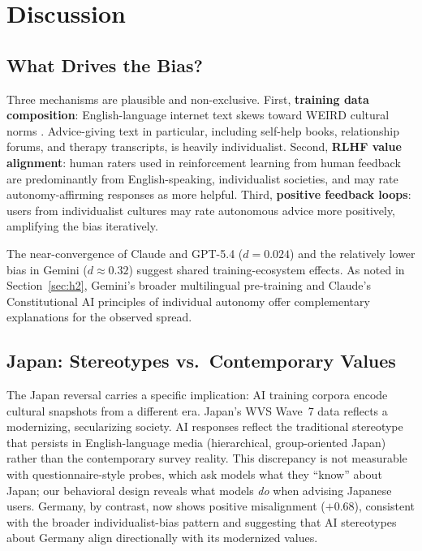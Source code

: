 \documentclass[11pt]{article}
\begin{document}
\section{Discussion}

\subsection{What Drives the Bias?}

Three mechanisms are plausible and non-exclusive. First,
\textbf{training data composition}: English-language internet text skews
toward WEIRD cultural norms \citep{henrich-2010}. Advice-giving text in
particular, including self-help books, relationship forums, and therapy
transcripts, is heavily individualist. Second, \textbf{RLHF value alignment}:
human raters used in reinforcement learning from human feedback are
predominantly from English-speaking, individualist societies, and may rate
autonomy-affirming responses as more helpful. Third, \textbf{positive
feedback loops}: users from individualist cultures may rate autonomous advice
more positively, amplifying the bias iteratively.

The near-convergence of Claude and GPT-5.4 ($d=0.024$) and the
relatively lower bias in Gemini ($d \approx 0.32$) suggest shared
training-ecosystem effects. As noted in Section~\ref{sec:h2}, Gemini's
broader multilingual pre-training and Claude's Constitutional AI principles
of individual autonomy \citep{bai-2022} offer complementary explanations
for the observed spread.

\subsection{Japan: Stereotypes vs.\ Contemporary Values}

The Japan reversal carries a specific implication: AI training corpora encode
cultural snapshots from a different era. Japan's WVS Wave~7 data reflects a
modernizing, secularizing society. AI responses reflect the traditional
stereotype that persists in English-language media (hierarchical,
group-oriented Japan) rather than the contemporary survey reality.
This discrepancy is not measurable with questionnaire-style probes, which ask
models what they ``know'' about Japan; our behavioral design reveals what
models \emph{do} when advising Japanese users. Germany, by contrast, now
shows positive misalignment ($+0.68$), consistent with the broader
individualist-bias pattern and suggesting that AI stereotypes about Germany
align directionally with its modernized values.
\end{document}
